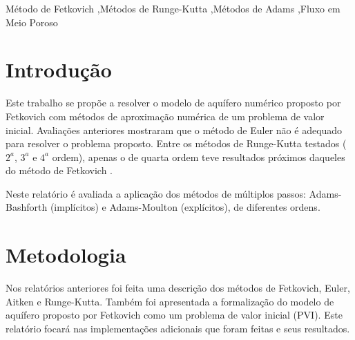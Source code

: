\documentclass[final,5p]{elsarticle}
\numberwithin{equation}{section}
\begin{document}
\begin{frontmatter}

\begin{keyword}
    Método de Fetkovich \sep Métodos de Runge-Kutta \sep Métodos de Adams \sep Fluxo em Meio Poroso



\end{keyword}

\end{frontmatter}


\section{Introdução}

    Este trabalho se propõe a resolver o modelo de aquífero numérico proposto por Fetkovich com métodos de aproximação numérica de um problema de valor inicial. Avaliações anteriores mostraram que o método de Euler não é adequado para resolver o problema proposto. Entre os métodos de Runge-Kutta testados ($2^a$, $3^a$ e $4^a$ ordem), apenas o de quarta ordem teve resultados próximos daqueles do método de Fetkovich \cite{relatoriorungekutta}.

    Neste relatório é avaliada a aplicação dos métodos de múltiplos passos: Adams-Bashforth (implícitos) e Adams-Moulton (explícitos), de diferentes ordens.

\section{Metodologia}

        Nos relatórios anteriores \cite{relatorioeuler}\cite{relatoriorungekutta} foi feita uma descrição dos métodos de Fetkovich, Euler, Aitken e Runge-Kutta. Também foi apresentada a formalização do modelo de aquífero proposto por Fetkovich como um problema de valor inicial (PVI). Este relatório focará nas implementações adicionais que foram feitas e seus resultados.
\end{document}
